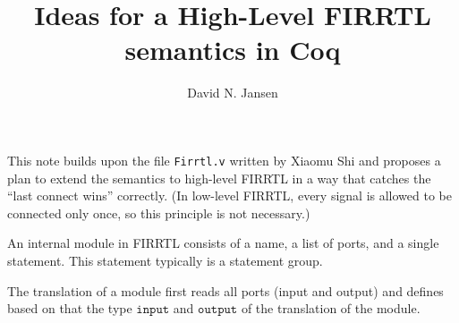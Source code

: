 \documentclass[a4paper]{article}
\title{Ideas for a High-Level FIRRTL semantics in Coq}
\author{David N. Jansen}
\begin{document}
\maketitle

This note builds upon the file \texttt{Firrtl.v} written by Xiaomu Shi
and proposes a plan to extend the semantics to high-level FIRRTL
in a way that catches the ``last connect wins'' correctly.
(In low-level FIRRTL, every signal is allowed to be connected only once,
so this principle is not necessary.)

An internal module in FIRRTL consists of a name, a list of ports, and a single statement.
This statement typically is a statement group.

The translation of a module first reads all ports (input and output) and defines based on that the type $\mathtt{input}$ and $\mathtt{output}$ of the translation of the module.
\end{document}
